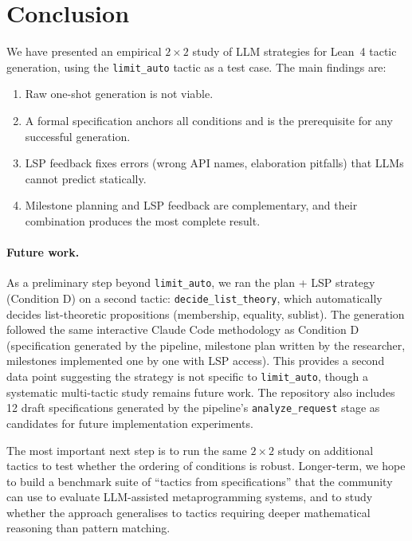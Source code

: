 \documentclass{llncs}
\begin{document}
\section{Conclusion}

We have presented an empirical $2 \times 2$ study of LLM strategies for
Lean~4 tactic generation, using the \texttt{limit\_auto} tactic as a
test case.  The main findings are:
\begin{enumerate}
  \item Raw one-shot generation is not viable.
  \item A formal specification anchors all conditions and is the prerequisite
        for any successful generation.
  \item LSP feedback fixes errors (wrong API names, elaboration pitfalls)
        that LLMs cannot predict statically.
  \item Milestone planning and LSP feedback are complementary, and their
        combination produces the most complete result.
\end{enumerate}

\paragraph{Future work.}
As a preliminary step beyond \texttt{limit\_auto}, we ran the plan + LSP strategy
(Condition D) on a second tactic: \texttt{decide\_list\_theory}, which automatically
decides list-theoretic propositions (membership, equality, sublist).
The generation followed the same interactive Claude Code methodology as Condition D
(specification generated by the pipeline, milestone plan written by the researcher,
milestones implemented one by one with LSP access).
This provides a second data point suggesting the strategy is not specific to
\texttt{limit\_auto}, though a systematic multi-tactic study remains future work.
The repository also includes 12 draft specifications generated by the pipeline's
\texttt{analyze\_request} stage as candidates for future implementation experiments.

The most important next step is to run the same $2 \times 2$ study on additional
tactics to test whether the ordering of conditions is robust.  Longer-term, we hope
to build a benchmark suite of ``tactics from specifications'' that the community can
use to evaluate LLM-assisted metaprogramming systems, and to study whether the
approach generalises to tactics requiring deeper mathematical reasoning than
pattern matching.
\end{document}
